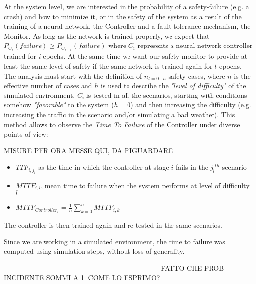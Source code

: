 At the system level, we are interested in the probability of a safety-failure (e.g. a crash) and how to minimize it, or in the safety of the system as a result of the training of a neural network, the Controller and a fault tolerance mechanism, the Monitor. As long as the network is trained properly, we expect that $P_{C_{i}}(failure) \geq P_{C_{i+t}}(failure)$ where $C_{i}$ represents a neural network controller trained for $i$ epochs. At the same time we want our safety monitor to provide at least the same level of safety if the same network is trained again for $t$ epochs.\newline
The analysis must start with the definition of $n_{l=0\dots h}$ safety cases, where $n$ is the effective number of cases and $h$ is used to describe the \textsl{"level of difficulty"} of the simulated environment. $C_{i}$ is tested in all the scenarios, starting with conditions somehow \textsl{"favorable"} to the system ($h=0$) and then increasing the difficulty (e.g. increasing the traffic in the scenario and/or simulating a bad weather). This method allows to observe the \textsl{Time To Failure} of the Controller under diverse points of view:


MISURE PER ORA MESSE QUI, DA RIGUARDARE


\begin{itemize}
	\item $TTF_{i,j_{l}}$ as the time in which the controller at stage $i$ fails in the ${j_{l}}^{th}$ scenario
	\item $MTTF_{i,l}$, mean time to failure when the system performs at level of difficulty $l$
	\item $MTTF_{Controller_{i}} = \frac{1}{n} \sum_{k = 0}^{n} MTTF_{i,k}$
\end{itemize}

The controller is then trained again and re-tested in the same scenarios.

Since we are working in a simulated environment, the time to failure was computed using simulation steps, without loss of generality.\newline 

-------------------------------------------------------------------        FATTO CHE PROB INCIDENTE SOMMI A 1. COME LO ESPRIMO?\newline

